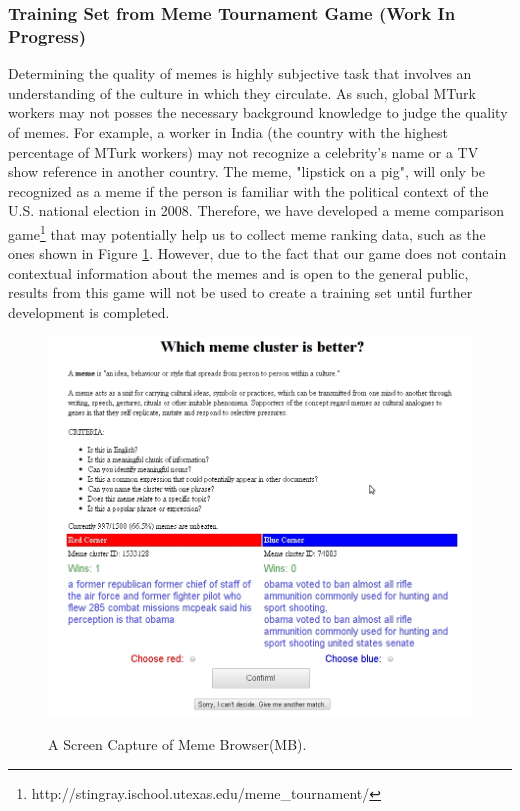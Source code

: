 \documentclass{sig-alternate}
\begin{document}
\subsubsection{Training Set from Meme Tournament Game (Work In Progress)}
Determining the quality of memes is highly subjective task that involves an understanding of the culture in which they circulate. As such, global MTurk workers may not posses the necessary background knowledge to judge the quality of memes. For example, a worker in India (the country with the highest percentage of MTurk workers) may not recognize a celebrity's name or a TV show reference in another country. The meme, "lipstick on a pig", will only be recognized as a meme if the person is familiar with the political context of the U.S. national election in 2008. Therefore, we have developed a meme comparison game\footnote{http://stingray.ischool.utexas.edu/meme\_tournament/} that may potentially help us to collect meme ranking data, such as the ones shown in Figure \ref{fig:game}. However, due to the fact that our game does not contain contextual information about the memes and is open to the general public, results from this game will not be used to create a training set until further development is completed.

\begin{figure}[htb]
	\begin{center}
		{\includegraphics[width=\textwidth]{game.jpg}}
	\end{center}
	\caption{A Screen Capture of Meme Browser(MB).}
	\label{fig:game}
\end{figure}
\end{document}
